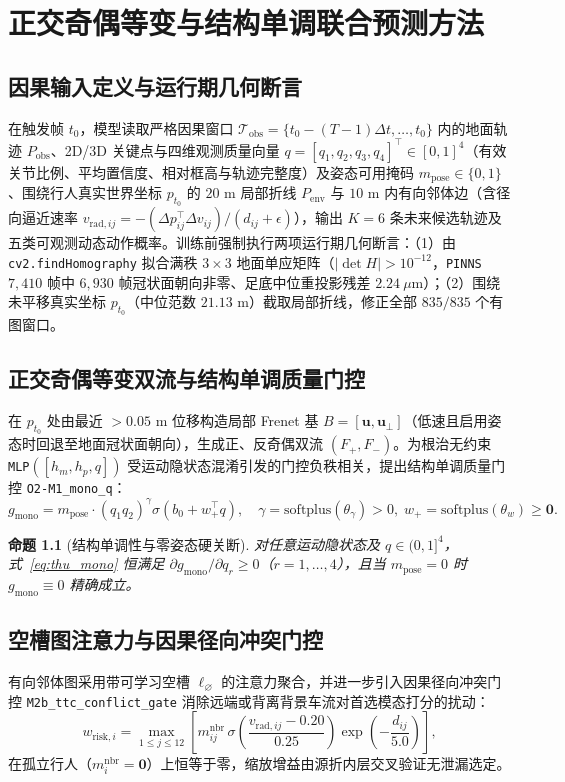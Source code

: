 \documentclass[UTF8,a4paper,12pt,openany,oneside]{ctexrep}
\newtheorem{proposition}{命题}[chapter]
\begin{document}
\chapter{正交奇偶等变与结构单调联合预测方法}
\section{因果输入定义与运行期几何断言}
在触发帧 $t_0$，模型读取严格因果窗口 $\mathcal{T}_{\text{obs}}=\{t_0-(T-1)\Delta t,\dots,t_0\}$ 内的地面轨迹 $P_{\text{obs}}$、2D/3D 关键点与四维观测质量向量 $q=[q_1,q_2,q_3,q_4]^\top\in[0,1]^4$（有效关节比例、平均置信度、相对框高与轨迹完整度）及姿态可用掩码 $m_{\text{pose}}\in\{0,1\}$、围绕行人真实世界坐标 $p_{t_0}$ 的 $20\text{ m}$ 局部折线 $P_{\text{env}}$ 与 $10\text{ m}$ 内有向邻体边（含径向逼近速率 $v_{\text{rad},ij}=-(\Delta p_{ij}^\top\Delta v_{ij})/(d_{ij}+\epsilon)$），输出 $K=6$ 条未来候选轨迹及五类可观测动态动作概率。训练前强制执行两项运行期几何断言：（1）由 \texttt{cv2.findHomography} 拟合满秩 $3\times 3$ 地面单应矩阵（$|\det H|>10^{-12}$，\texttt{PINNS} $7{,}410$ 帧中 $6{,}930$ 帧冠状面朝向非零、足底中位重投影残差 $2.24\ \mu\text{m}$）；（2）围绕未平移真实坐标 $p_{t_0}$（中位范数 $21.13\text{ m}$）截取局部折线，修正全部 $835/835$ 个有图窗口。

\section{正交奇偶等变双流与结构单调质量门控}
在 $p_{t_0}$ 处由最近 $>0.05\text{ m}$ 位移构造局部 Frenet 基 $B=[\mathbf{u},\mathbf{u}_\perp]$（低速且启用姿态时回退至地面冠状面朝向），生成正、反奇偶双流 $(F_+,F_-)$。为根治无约束 \texttt{MLP}$([h_m,h_p,q])$ 受运动隐状态混淆引发的门控负秩相关，提出结构单调质量门控 \texttt{O2-M1\_mono\_q}：
\begin{equation}
  g_{\text{mono}} = m_{\text{pose}}\cdot (q_1 q_2)^{\gamma}\sigma(b_0 + w_+^\top q), \quad \gamma=\text{softplus}(\theta_\gamma)>0,\; w_+=\text{softplus}(\theta_w)\ge\mathbf{0}.
  \label{eq:thu_mono}
\end{equation}

\begin{proposition}[结构单调性与零姿态硬关断]
对任意运动隐状态及 $q\in(0,1]^4$，式~\eqref{eq:thu_mono} 恒满足 $\partial g_{\text{mono}}/\partial q_r \ge 0$（$r=1,\dots,4$），且当 $m_{\text{pose}}=0$ 时 $g_{\text{mono}}\equiv 0$ 精确成立。
\end{proposition}

\section{空槽图注意力与因果径向冲突门控}
有向邻体图采用带可学习空槽 $\ell_\varnothing$ 的注意力聚合，并进一步引入因果径向冲突门控 \texttt{M2b\_ttc\_conflict\_gate} 消除远端或背离背景车流对首选模态打分的扰动：
\begin{equation}
  w_{\text{risk},i} = \max_{1\le j\le 12}\left[m^{\text{nbr}}_{ij}\,\sigma\!\left(\frac{v_{\text{rad},ij}-0.20}{0.25}\right)\exp\!\left(-\frac{d_{ij}}{5.0}\right)\right],
  \label{eq:thu_conflict}
\end{equation}
在孤立行人（$m^{\text{nbr}}_i=\mathbf{0}$）上恒等于零，缩放增益由源折内层交叉验证无泄漏选定。
\end{document}
